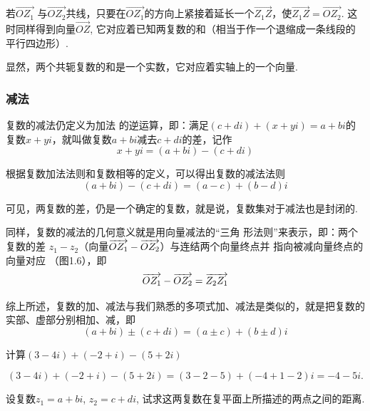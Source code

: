 若$\overrightarrow{OZ_{1}}$ 与$\overrightarrow{OZ_{2}}$共线，只要在$\overrightarrow{OZ_{1}}$的方向上紧接着延长一个$\overrightarrow{Z_{1}Z}$，使$\overrightarrow{Z_{1}Z}=\overrightarrow{OZ_{2}}$. 这时同样得到向量$\overrightarrow{OZ}$, 它对应着已知两复数的和（相当于作一个退缩成一条线段的平行四边形）.

显然，两个共轭复数的和是一个实数，它对应着实轴上的一个向量. 

\subsubsection{减法}
复数的减法仍定义为加法
的逆运算，即：满足$(c+di)+(x+yi)=a+bi$的复数$x+yi$，就叫做复数$a+bi$减去$c+di$的差，记作
\[x+yi=(a+bi)-(c+di)\]

根据复数加法法则和复数相等的定义，可以得出复数的减法法则
\[(a+bi)-(c+di)=(a-c)+(b-d)i\]

可见，两复数的差，仍是一个确定的复数，就是说，复数集对于减法也是封闭的.

同样，复数的减法的几何意义就是用向量减法的“三角
形法则”来表示，即：两个复数的差
$z_1-z_2$（向量$\overrightarrow{OZ_1}-\overrightarrow{OZ_2}$）与连结两个向量终点并
指向被减向量终点的向量对应
（图1.6），即
\[\overrightarrow{OZ_1}-\overrightarrow{OZ_2}=\overrightarrow{Z_2Z_1}\]

\begin{figure}[htp]
    \centering
{}
    \caption{}
\end{figure}

综上所述，复数的加、减法与我们熟悉的多项式加、减法是类似的，就是把复数的实部、虚部分别相加、减，即
\[(a+bi)\pm (c+di)=(a\pm c)+(b\pm d)i\]

\begin{example}
    计算$(3-4i)+(-2+i)-(5+2i)$
\end{example}

\begin{solution}
 $$(3-4i)+(-2+i)-(5+2i)
=(3-2-5)+(-4+1-2)i=-4-5i.$$   
\end{solution}

\begin{example}
    设复数$z_1=a+bi$, $z_2=c+di$, 试求这两复数在复平面上所描述的两点之间的距离.
\end{example}


